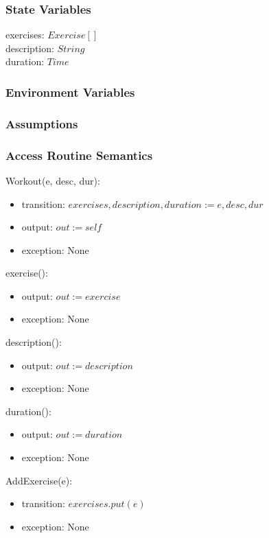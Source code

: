 \documentclass[12pt, titlepage]{article}
\begin{document}
\subsubsection{State Variables}
exercises: $Exercise[]$ \\
description: $String$ \\
duration: $Time$ \\

\subsubsection{Environment Variables}

\subsubsection{Assumptions}

\subsubsection{Access Routine Semantics}

Workout(e, desc, dur):
\begin{itemize}
	\item transition: $exercises, description, duration := e, desc, dur$
	\item output: $out := self$
	\item exception: None
\end{itemize}

exercise():
\begin{itemize}
	\item output: $out := exercise$
	\item exception: None
\end{itemize}

description():
\begin{itemize}
	\item output: $out := description$
	\item exception: None
\end{itemize}

duration():
\begin{itemize}
	\item output: $out := duration$
	\item exception: None
\end{itemize}

AddExercise(e):
\begin{itemize}
	\item transition: $exercises.put(e)$
	\item exception: None
\end{itemize}
\end{document}
